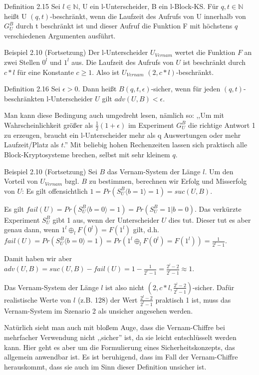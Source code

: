 \documentclass[a4paper]{article}
\begin{document}
\begin{multicols}{3}
    Definition 2.15 Sei $l\in\mathbb{N}$, U ein l-Unterscheider, B ein l-Block-KS. Für $q,t\in\mathbb{N}$ heißt U $(q,t)$-beschränkt, wenn die Laufzeit des Aufrufs von U innerhalb von $G^B_U$ durch t beschränkt ist und dieser Aufruf die Funktion F mit höchstens $q$ verschiedenen Argumenten ausführt.

    Beispiel 2.10 (Fortsetzung) Der l-Unterscheider $U_{Vernam}$ wertet die Funktion $F$ an zwei Stellen $0^l$ und $1^l$ aus. Die Laufzeit des Aufrufs von $U$ ist beschränkt durch $c*l$ für eine Konstante $c\geq 1$. Also ist $U_{Vernam}$ $(2,c*l)$-beschränkt.

    Definition 2.16 Sei $\epsilon>0$. Dann heißt $B(q,t,\epsilon)$-sicher, wenn für jeden $(q,t)$-beschränkten l-Unterscheider $U$ gilt $adv(U,B)< \epsilon$.

    Man kann diese Bedingung auch umgedreht lesen, nämlich so: ,,Um mit Wahrscheinlichkeit größer als $\frac{1}{2}(1 +\epsilon)$ im Experiment $G^B_U$ die richtige Antwort 1 zu erzeugen, braucht ein l-Unterscheider mehr als q Auswertungen oder mehr Laufzeit/Platz als $t$.''  Mit beliebig hohen Rechenzeiten lassen sich praktisch alle Block-Kryptosysteme brechen, selbst mit sehr kleinem $q$.

    Beispiel 2.10 (Fortsetzung) Sei $B$ das Vernam-System der Länge $l$. Um den Vorteil von $U_{Vernam}$ bzgl. $B$ zu bestimmen, berechnen wir Erfolg und Misserfolg von $U$: Es gilt offensichtlich $1=Pr(S^B_U\langle b= 1\rangle = 1) = suc(U,B)$.

    Es gilt $fail(U) = Pr(S^B_U\langle b= 0\rangle = 1) = Pr(S_U^B= 1|b= 0)$. Das verkürzte Experiment $S_U^B$ gibt 1 aus, wenn der Unterscheider $U$ dies tut. Dieser tut es aber genau dann, wenn $1^l\oplus_l F(0^l) =F(1^l)$ gilt, d.h. $fail(U) = Pr(S_U^B\langle b= 0\rangle = 1) = Pr(1^l\oplus_l F(0^l) =F(1^l)) = \frac{1}{2^l- 1}$.

    Damit haben wir aber $adv(U,B) = suc(U,B)-fail(U) = 1-\frac{1}{2^l- 1}=\frac{2^l-2}{2^l-1}\approx 1$.

    Das Vernam-System der Länge $l$ ist also nicht $(2,c*l,\frac{2^l- 2}{2^l- 1})$-sicher. Dafür realistische Werte von $l$ (z.B. 128) der Wert $\frac{2^l-2}{2^l-1}$ praktisch 1 ist, muss das Vernam-System im Szenario 2 als unsicher angesehen werden.

    Natürlich sieht man auch mit bloßem Auge, dass die Vernam-Chiffre bei mehrfacher Verwendung nicht ,,sicher'' ist, da sie leicht entschlüsselt werden kann. Hier geht es aber um die Formulierung eines Sicherheitskonzepts, das allgemein anwendbar ist. Es ist beruhigend, dass im Fall der Vernam-Chiffre herauskommt, dass sie auch im Sinn dieser Definition unsicher ist.


\end{multicols}
\end{document}
